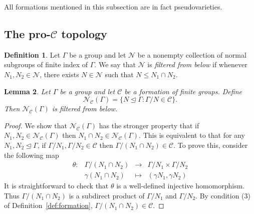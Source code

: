 \documentclass[11pt]{amsart}
\newtheorem{theorem}{Theorem}[section]
\newtheorem{lemma}[theorem]{Lemma}
\theoremstyle{definition}
\newtheorem{definition}[theorem]{Definition}
\theoremstyle{definition}
\numberwithin{equation}{section}
\begin{document}
All formations mentioned in this subsection are in fact pseudovarieties.

\subsection{The pro-$\mathcal{C}$ topology}

\begin{definition} Let $\Gamma$ be a group and let $\mathcal{N}$ be a nonempty collection of normal subgroups of finite index of $\Gamma$. We say that $\mathcal{N}$ is {\em filtered from below} if whenever $N_1, N_2\in\mathcal{N}$, there exists $N\in\mathcal{N}$ such that $N\leq N_1\cap N_2$.
\end{definition}

\begin{lemma}\label{lem:filteredbelow} Let $\Gamma$ be a group and let $\mathcal{C}$ be a formation of finite groups. Define
$$ \mathcal{N}_{\mathcal{C}}(\Gamma)=\{N\unlhd \Gamma\colon \Gamma/N\in\mathcal{C}\}. $$
Then $\mathcal{N}_{\mathcal{C}}(\Gamma)$ is filtered from below.
\end{lemma}

\begin{proof} We show that $\mathcal{N}_{\mathcal{C}}(\Gamma)$ has the stronger property that if $N_1, N_2\in \mathcal{N}_{\mathcal{C}}(\Gamma)$ then $N_1\cap N_2\in\mathcal{N}_{\mathcal{C}}(\Gamma)$. This is equivalent to that for any $N_1, N_2\unlhd \Gamma$, if $\Gamma/N_1, \Gamma/N_2\in\mathcal{C}$ then $\Gamma/(N_1\cap N_2)\in \mathcal{C}$. To prove this, consider the following map 
$$\begin{array}{rrcl} \theta\colon & \Gamma/(N_1\cap N_2)& \to & \Gamma/N_1\times\Gamma/N_2 \\
& \gamma(N_1\cap N_2) & \mapsto & (\gamma N_1, \gamma N_2) 
\end{array}
$$
It is straightforward to check that $\theta$ is a well-defined injective homomorphism. Thus $\Gamma/(N_1\cap N_2)$ is a subdirect product of $\Gamma/N_1$ and $\Gamma/N_2$. By condition (3) of Definition~\ref{def:formation}, $\Gamma/(N_1\cap N_2)\in \mathcal{C}$. 
\end{proof}
\end{document}
